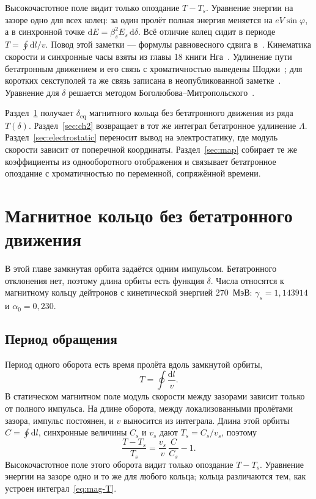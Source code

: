 \documentclass[aps,pra,preprint,a4paper,amsmath,amssymb,longbibliography]{revtex4-2}
\begin{document}
Высокочастотное поле видит только опоздание $T-T_s$. Уравнение энергии на зазоре одно для всех колец: за один пролёт полная энергия меняется на $eV\sin\varphi$, а в синхронной точке $\mathrm{d}E=\beta_s^2 E_s\,\mathrm{d}\delta$. Всё отличие колец сидит в периоде $T=\oint\mathrm{d}l/v$. Повод этой заметки --- формулы равновесного сдвига в~\cite{Senichev2013}. Кинематика скорости и синхронные часы взяты из главы 18 книги Нга~\cite{Ng2006}. Удлинение пути бетатронным движением и его связь с хроматичностью выведены Шоджи~\cite{Shoji2005}; для коротких секступолей та же связь записана в неопубликованной заметке~\cite{SenichevNote}. Уравнение для $\delta$ решается методом Боголюбова--Митропольского~\cite{Bogoliubov1961}.

Раздел~\ref{sec:magnetic} получает $\delta_{\mathrm{eq}}$ магнитного кольца без бетатронного движения из ряда $T(\delta)$. Раздел~\ref{sec:ch2} возвращает в тот же интеграл бетатронное удлинение $\Lambda$. Раздел~\ref{sec:electrostatic} переносит вывод на электростатику, где модуль скорости зависит от поперечной координаты. Раздел~\ref{sec:map} собирает те же коэффициенты из однооборотного отображения и связывает бетатронное опоздание с хроматичностью по переменной, сопряжённой времени.
\section{Магнитное кольцо без бетатронного движения}
\label{sec:magnetic}

В этой главе замкнутая орбита задаётся одним импульсом. Бетатронного отклонения нет, поэтому длина орбиты есть функция $\delta$. Числа относятся к магнитному кольцу дейтронов с кинетической энергией $270$~МэВ: $\gamma_s=1{,}143914$ и $\alpha_0=0{,}230$.

\subsection{Период обращения}
\label{sec:period}

Период одного оборота есть время пролёта вдоль замкнутой орбиты,
\begin{equation}
\label{eq:mag-T}
T=\oint\frac{\mathrm{d}l}{v}.
\end{equation}
В статическом магнитном поле модуль скорости между зазорами зависит только от полного импульса. На длине оборота, между локализованными пролётами зазора, импульс постоянен, и $v$ выносится из интеграла. Длина этой орбиты $C=\oint\mathrm{d}l$, синхронные величины $C_s$ и $v_s$ дают $T_s=C_s/v_s$, поэтому
\begin{equation}
\label{eq:mag-Tratio}
\frac{T-T_s}{T_s}
=\frac{v_s}{v}\,\frac{C}{C_s}-1.
\end{equation}
Высокочастотное поле этого оборота видит только опоздание $T-T_s$. Уравнение энергии на зазоре одно и то же для любого кольца; кольца различаются тем, как устроен интеграл~\eqref{eq:mag-T}.
\end{document}
